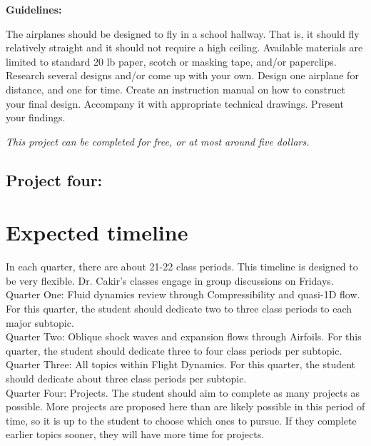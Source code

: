 \documentclass[12pt]{article}
\begin{document}
			\textbf{Guidelines: }
				\begin{outline}
					\1 The airplanes should be designed to fly in a school hallway. That is, it should fly relatively straight and it should not require a high ceiling. 
					\1 Available materials are limited to standard 20 lb paper, scotch or masking tape, and/or paperclips. 
					\1 Research several designs and/or come up with your own. 
					\1 Design one airplane for distance, and one for time. 
					\1 Create an instruction manual on how to construct your final design. Accompany it with appropriate technical drawings. 
					\1 Present your findings. 
				\end{outline}
				\textit{This project can be completed for free, or at most around five dollars. }
		\subsection{Project four: }
	\section{Expected timeline}
		In each quarter, there are about 21-22 class periods. This timeline is designed to be very flexible. Dr. Cakir's classes engage in group discussions on Fridays.\\ 
		
		Quarter One: Fluid dynamics review through Compressibility and quasi-1D flow. For this quarter, the student should dedicate two to three class periods to each major subtopic. \\
		
		Quarter Two: Oblique shock waves and expansion flows through Airfoils. For this quarter, the student should dedicate three to four class periods per subtopic. \\
		
		Quarter Three: All topics within Flight Dynamics. For this quarter, the student should dedicate about three class periods per subtopic. \\
		
		Quarter Four: Projects. The student should aim to complete as many projects as possible. More projects are proposed here than are likely possible in this period of time, so it is up to the student to choose which ones to pursue. If they complete earlier topics sooner, they will have more time for projects. \\
\end{document}
